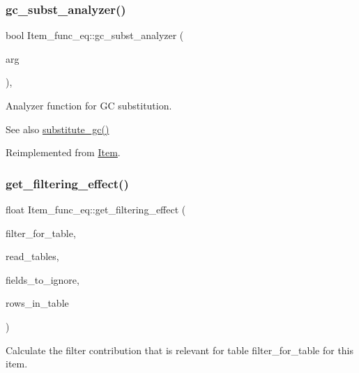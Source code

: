 \subsubsection{\texorpdfstring{gc\+\_\+subst\+\_\+analyzer()}{gc\_subst\_analyzer()}}
{\footnotesize\ttfamily bool Item\+\_\+func\+\_\+eq\+::gc\+\_\+subst\+\_\+analyzer (\begin{DoxyParamCaption}\item[{uchar $\ast$$\ast$}]{arg }\end{DoxyParamCaption})\hspace{0.3cm}{\ttfamily [inline]}, {\ttfamily [virtual]}}

Analyzer function for GC substitution. \begin{DoxySeeAlso}{See also}
\mbox{\hyperlink{group__Query__Optimizer_gaa95a062cdd785687a638e01d7ad85d11}{substitute\+\_\+gc()}} 
\end{DoxySeeAlso}


Reimplemented from \mbox{\hyperlink{classItem_aea5d6f41e9cd5d17d8e6e8d44bee9c3e}{Item}}.

\mbox{\label{classItem__func__eq_a2fcef97ba353457bb567011be900a680}} 
\subsubsection{\texorpdfstring{get\+\_\+filtering\+\_\+effect()}{get\_filtering\_effect()}}
{\footnotesize\ttfamily float Item\+\_\+func\+\_\+eq\+::get\+\_\+filtering\+\_\+effect (\begin{DoxyParamCaption}\item[{table\+\_\+map}]{filter\+\_\+for\+\_\+table,  }\item[{table\+\_\+map}]{read\+\_\+tables,  }\item[{const M\+Y\+\_\+\+B\+I\+T\+M\+AP $\ast$}]{fields\+\_\+to\+\_\+ignore,  }\item[{double}]{rows\+\_\+in\+\_\+table }\end{DoxyParamCaption})\hspace{0.3cm}{\ttfamily [virtual]}}

Calculate the filter contribution that is relevant for table \textquotesingle{}filter\+\_\+for\+\_\+table\textquotesingle{} for this item.


